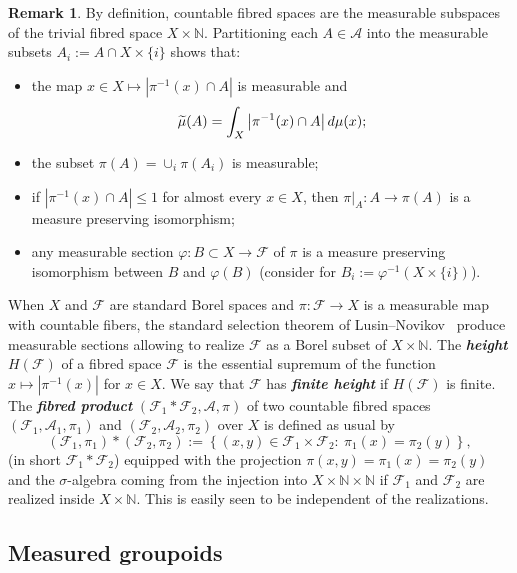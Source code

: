 \documentclass[10pt]{amsart}
\theoremstyle{definition}
\newtheorem{rema}[cdrthm]{Remark}
\newcommand{\defin}[1]{\textbf{\emph{#1}}}
\newcommand{\Nmath}{\mathbb{N}}
\newcommand{\cf}{\mathcal{F}}
\newcommand{\ra}{\mathscr{A}}
\newcommand{\ph}{\varphi}
\let\oldtilde\tilde
\renewcommand*{\tilde}[1]{\mathchoice{\widetilde{#1}}{\widetilde{#1}}{\oldtilde{#1}}{\oldtilde{#1}}}
\begin{document}
\begin{rema}\label{rem: count fibred sp. and measurab}
By definition, countable fibred spaces are the measurable subspaces of the trivial fibred space $X \times \Nmath$. Partitioning each $A \in \ra$ into the measurable subsets $A_i:=A\cap X\times\{i\}$ shows that:
\begin{itemize}
\item the map $x \in X\mapsto |\pi^{-1}(x) \cap A|$ is measurable and
\begin{equation}\label{eq: tilde mu on fibred}
\tilde\mu(A)=\int_X\left| \pi^{-1}(x)\cap A\right| d\mu(x);
\end{equation}
\item the subset $\pi(A)=\cup_i \pi(A_i)$ is measurable;
\item if $|\pi^{-1}(x)\cap A|\leq 1$ for almost every $x\in X$, then $\pi\bigr|_A:A\to \pi(A)$ is a measure preserving isomorphism;
\item any measurable section $\ph:B\subset X\to \cf$ of $\pi$ is a measure preserving isomorphism between $B$ and $\ph(B)$ (consider for $B_i:=\ph^{-1} (X\times \{i\})$).
\end{itemize}
\end{rema}


When $X$ and $\cf$ are standard Borel spaces and $\pi \colon \cf \to X$ is a measurable map with countable fibers, the standard selection theorem of Lusin--Novikov~\cite{Lusin-Novikoff-1935} produce measurable sections allowing to realize $\cf$ as a Borel subset of $X \times \Nmath$. The \defin{height} $H(\cf)$ of a fibred space $\cf$ is the essential supremum of the function $x\mapsto |\pi^{-1}(x)|$ for $x\in X$. We say that $\cf$ has
\defin{finite height} if $H(\cf)$ is finite. The
\defin{fibred product} $(\cf_1*\cf_2,\ra,\pi)$ of two countable fibred spaces $(\cf_1,\ra_1,\pi_1)$ and $(\cf_2,\ra_2,\pi_2)$ over $X$ is defined as usual by
\[
(\cf_1,\pi_1)*(\cf_2, \pi_2):=\left\{ (x,y)\in \cf_1\times \cf_2:\ \pi_1(x)=\pi_2(y)\right\},
\]
(in short $\cf_1*\cf_2$) equipped with the projection $\pi(x,y)= \pi_1(x) = \pi_2(y)$ and the $\sigma$-algebra coming from the injection into $X \times\Nmath \times \Nmath$ if $\cf_1$ and $\cf_2$ are realized inside $X \times \Nmath$. This is easily seen to be independent of the realizations.

\subsection{Measured groupoids}
\end{document}
